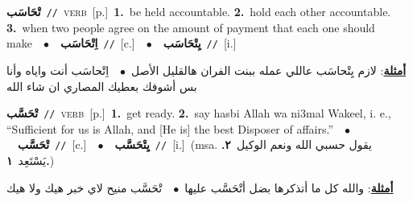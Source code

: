 \documentclass[10pt,a4paper,twoside]{article} %
\begin{document}
\begin{multicols}{2}
{\setlength\topsep{0pt}\textbf{\foreignlanguage{arabic}{تْحَاسَب}}\ {\color{gray}\texttt{//}\color{black}}\ \textsc{verb}\ [p.]\ \textbf{1.}~be held accountable.  \textbf{2.}~hold each other accountable.  \textbf{3.}~when two people agree on the amount of payment that each one should make\ \ $\bullet$\ \ \setlength\topsep{0pt}\textbf{\foreignlanguage{arabic}{اِتْحَاسَب}}\ {\color{gray}\texttt{//}\color{black}}\ [c.]\ \ $\bullet$\ \ \setlength\topsep{0pt}\textbf{\foreignlanguage{arabic}{يِتْحَاسَب}}\ {\color{gray}\texttt{//}\color{black}}\ [i.]\  \begin{flushright}\color{gray}\foreignlanguage{arabic}{\textbf{\underline{\foreignlanguage{arabic}{أمثلة}}}: لازم يِتْحاسَب عاللي عمله ببنت الفران هالقليل الأصل\ $\bullet$\ \  اِتْحاسَب أنت واياه وأنا بس أشوفك بعطيك المصاري ان شاء الله}\end{flushright}\color{black}} \vspace{2mm}

{\setlength\topsep{0pt}\textbf{\foreignlanguage{arabic}{تْحَسَّب}}\ {\color{gray}\texttt{//}\color{black}}\ \textsc{verb}\ [p.]\ \textbf{1.}~get ready.  \textbf{2.}~say hasbi Allah wa ni3mal Wakeel, i. e., “Sufficient for us is Allah, and [He is] the best Disposer of affairs.”\ \ $\bullet$\ \ \setlength\topsep{0pt}\textbf{\foreignlanguage{arabic}{تْحَسَّب}}\ {\color{gray}\texttt{//}\color{black}}\ [c.]\ \ $\bullet$\ \ \setlength\topsep{0pt}\textbf{\foreignlanguage{arabic}{يِتْحَسَّب}}\ {\color{gray}\texttt{//}\color{black}}\ [i.]\ \color{gray}(msa. \foreignlanguage{arabic}{يقول حسبي الله ونعم الوكيل}~\foreignlanguage{arabic}{\textbf{٢.}}  \foreignlanguage{arabic}{يَسْتَعِد}~\foreignlanguage{arabic}{\textbf{١.}})\color{black}\  \begin{flushright}\color{gray}\foreignlanguage{arabic}{\textbf{\underline{\foreignlanguage{arabic}{أمثلة}}}: والله كل ما أتذكرها بضل أتْحَسَّب عليها\ $\bullet$\ \  تْحَسَّب منيح لاي خبر هيك ولا هيك}\end{flushright}\color{black}} \vspace{2mm}


\end{multicols}
\end{document}
